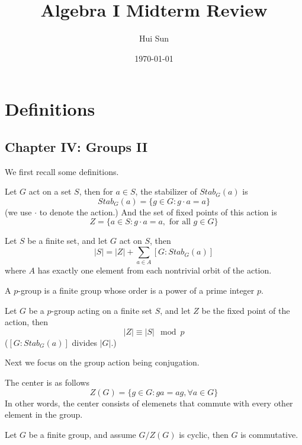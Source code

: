 \documentclass[openany]{book}
\title{Algebra I Midterm Review}
\date{\today}
\author{Hui Sun}
\begin{document}
\maketitle

\newpage
\tableofcontents

\chapter{Definitions}
\setcounter{chapter}{1}


\section{Chapter IV: Groups II}
We first recall some definitions.
\begin{defn}
    Let $G$ act on a set $S$, then for $a\in S$, the stabilizer of $Stab_G(a)$ is 
    \begin{equation*}
        Stab_G(a)=\{g\in G: g\cdot a=a\}
    \end{equation*}
    (we use $\cdot$ to denote the action.) And the set of fixed points of this action is 
    \begin{equation*}
        Z=\{a\in S: g\cdot a=a, \text{ for all } g\in G\}
    \end{equation*}
\end{defn}
\begin{prop}
    Let $S$ be a finite set, and let $G$ act on $S$, then 
    \begin{equation*}
        |S|=|Z|+\sum_{a\in A}[G:Stab_G(a)]
    \end{equation*}
    where $A$ has exactly one element from each nontrivial orbit of the action.
\end{prop}
\begin{defn}[$p$-group]
    A $p$-group is a finite group whose order is a power of a prime integer $p$.
\end{defn}
\begin{cor}
    Let $G$ be a $p$-group acting on a finite set $S$, and let $Z$ be the fixed point of the action, then 
    \begin{equation*}
    |Z|\equiv |S|\mod p
    \end{equation*}
    ($[G:Stab_G(a)]$ divides $|G|$.)
\end{cor}
Next we focus on the group action being conjugation.
\begin{defn}[center]
    The center is as follows
    \begin{equation*}
        Z(G)=\{g\in G: ga=ag, \forall a\in G\}
    \end{equation*}
    In other words, the center consists of elemenets that commute with every other element in the group.
\end{defn}
\begin{lem}
    Let $G$ be a finite group, and assume $G/Z(G)$ is cyclic, then $G$ is commutative.
\end{lem}
\end{document}

